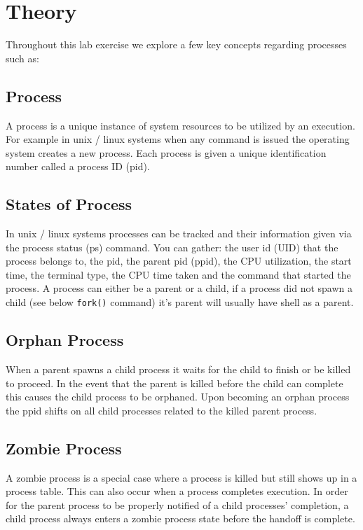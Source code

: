 
\section{Theory}\label{sec:theory}
    Throughout this lab exercise we explore a few key concepts regarding processes such as:

    \subsection{Process}\label{subsec:process}
        A process is a unique instance of system resources to be utilized by an execution.
        For example in unix / linux systems when any command is issued the operating system creates a new process.
        Each process is given a unique identification number called a process ID (pid).

    \subsection{States of Process}\label{subsec:states}
        In unix / linux systems processes can be tracked and their information given via the process status (ps) command.
        You can gather: the user id (UID) that the process belongs to, the pid, the parent pid (ppid), the CPU utilization, the start time, the terminal type, the CPU time taken and the command that started the process.
        A process can either be a parent or a child, if a process did not spawn a child (see below \texttt{fork()} command) it's parent will usually have shell as a parent.

    \subsection{Orphan Process}\label{subsec:orphan}
        When a parent spawns a child process it waits for the child to finish or be killed to proceed.
        In the event that the parent is killed before the child can complete this causes the child process to be orphaned.
        Upon becoming an orphan process the ppid shifts on all child processes related to the killed parent process.

    \subsection{Zombie Process}\label{subsec:zombie}
        A zombie process is a special case where a process is killed but still shows up in a process table.
        This can also occur when a process completes execution.
        In order for the parent process to be properly notified of a child processes' completion, a child process always enters a zombie process state before the handoff is complete.

